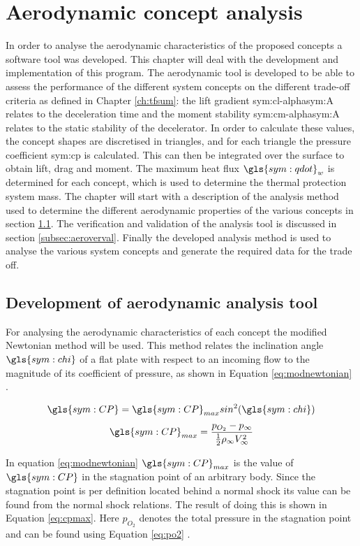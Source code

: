 \section{Aerodynamic concept analysis}
\label{ch:aero_analysis}
In order to analyse the aerodynamic characteristics of the proposed concepts a software tool was developed. This chapter will deal with the development and implementation of this program. The aerodynamic tool is developed to be able to assess the performance of the different system concepts on the different trade-off criteria as defined in Chapter \ref{ch:tfsum}: the lift gradient \gls{sym:cl-alpha}\gls{sym:A} relates to the deceleration time and the moment stability \gls{sym:cm-alpha}\gls{sym:A} relates to the static stability of the decelerator. In order to calculate these values, the concept shapes are discretised in triangles, and for each triangle the pressure coefficient \gls{sym:cp} is calculated. This can then be integrated over the surface to obtain lift, drag and moment. The maximum heat flux $\gls{sym:qdot}_w$ is determined for each concept, which is used to determine the thermal protection system mass. 
The chapter will start with a description of the analysis method used to determine the different aerodynamic properties of the various concepts in section \ref{subsec:aerotool}. The verification and validation of the analysis tool is discussed in section \ref{subsec:aeroverval}. Finally the developed analysis method is used to analyse the various system concepts and generate the required data for the trade off. 

\subsection{Development of aerodynamic analysis tool}
\label{subsec:aerotool}
For analysing the aerodynamic characteristics of each concept the modified Newtonian method will be used. This method relates the inclination angle $\gls{sym:chi}$ of a flat plate with respect to an incoming flow to the magnitude of its coefficient of pressure, as shown in Equation \ref{eq:modnewtonian} \cite{AndersonJr.2006}.
\begin{multicols}{2}
\begin{equation}
\gls{sym:CP}=\gls{sym:CP}_{max}sin^{2}(\gls{sym:chi})
\label{eq:modnewtonian}
\end{equation} \break
\begin{equation}
\gls{sym:CP}_{max}=\frac{p_{O_{2}}-p_{\infty}}{\frac{1}{2}\rho_{\infty}V_{\infty}^{2}}
\label{eq:cpmax}
\end{equation}
\end{multicols}
In equation \ref{eq:modnewtonian} $\gls{sym:CP}_{max}$ is the value of $\gls{sym:CP}$ in the stagnation point of an arbitrary body. Since the stagnation point is per definition located behind a normal shock its value can be found from the normal shock relations. The result of doing this is shown in Equation \ref{eq:cpmax}. Here $p_{O_{2}}$ denotes the total pressure in the stagnation point and can be found using Equation \ref{eq:po2} \cite{AndersonJr.2007}.

